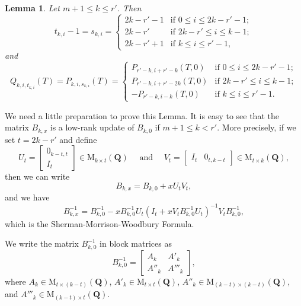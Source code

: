 \documentclass[11pt]{amsart}
\theoremstyle{definition}
\numberwithin{equation}{subsection}
\theoremstyle{plain}
\theoremstyle{plain}
\theoremstyle{plain}
\theoremstyle{plain}
\theoremstyle{plain}
\theoremstyle{plain}
\theoremstyle{plain}
\theoremstyle{plain}
\theoremstyle{plain}
\newtheorem{lemm}[equation]{Lemma}
\theoremstyle{plain}
\theoremstyle{plain}
\theoremstyle{plain}
\theoremstyle{definition}
\theoremstyle{definition}
\theoremstyle{definition}
\theoremstyle{remark}
\renewcommand{\(}{\textup{(}}
\renewcommand{\)}{\textup{)}}
\newcommand{\M}{\mathrm{M}}
\newcommand{\Q}{\mathbf{Q}}
\begin{document}
\begin{lemm}\label{lemma: m+1 to r}
    Let $m+1\leq k\leq r'$. Then
    \begin{equation*}
       t_{k,i}-1= s_{k,i}=
        \begin{cases}
            2k-r'-1 & \mbox{if } 0\leq i\leq 2k-r'-1; \\
            2k-r' & \mbox{if } 2k-r'\leq i\leq k-1;\\
            2k-r'+1 & \mbox{if } k\leq i\leq r'-1,
        \end{cases}
    \end{equation*}
    and
    \begin{equation*}
       Q_{k,i,t_{k,i}}(T)= P_{k,i,s_{k,i}}(T)
        =
        \begin{cases}
            P_{r'-k,i+r'-k}(T,0) & \mbox{if } 0\leq i\leq 2k-r'-1; \\
            P_{r'-k, i+r'-2k}(T,0) & \mbox{if } 2k-r'\leq i\leq k-1;\\
            -P_{r'-k,i-k}(T,0) & \mbox{if } k\leq i\leq r'-1.
        \end{cases}
    \end{equation*}
\end{lemm}

We need a little preparation to prove this Lemma. It is easy to see that the matrix $B_{k,x}$ is a low-rank update of $B_{k,0}$ if $m+1\leq k<r'$. More precisely, if we set $t=2k-r'$ and define
\begin{equation*}
    U_t
    =
    \begin{bmatrix}
       0_{k-t,t} \\
       I_t
    \end{bmatrix}
    \in\M_{k\times t}(\Q)\quad\mbox{ and }\quad
    V_t=
    \begin{bmatrix}
        I_t & 0_{t,k-t}
    \end{bmatrix}
    \in\M_{t\times k}(\Q),
\end{equation*}
then we can write
\begin{equation*}
    B_{k,x}=B_{k,0}+xU_tV_t,
\end{equation*}
and we have
\begin{equation}\label{eq: inverse of B_k,x}
    B_{k,x}^{-1}=B_{k,0}^{-1}-xB_{k,0}^{-1}U_t(I_t+xV_tB_{k,0}^{-1}U_t)^{-1}V_tB_{k,0}^{-1},
\end{equation}
which is the Sherman-Morrison-Woodbury Formula.

We write the matrix $B_{k,0}^{-1}$ in block matrices as
\begin{equation*}
    B_{k,0}^{-1}=
    \begin{bmatrix}
        A_k & A'_k \\
        A''_k & A'''_k
    \end{bmatrix},
\end{equation*}
where $A_k\in\M_{t\times (k-t)}(\Q)$, $A'_k\in\M_{t\times t}(\Q)$, $A''_k\in\M_{(k-t)\times (k-t)}(\Q)$, and $A'''_k\in\M_{(k-t)\times t}(\Q)$.
\end{document}
